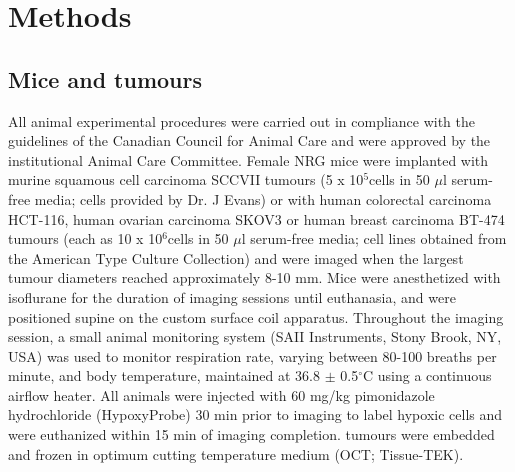 \section{Methods}
\subsection{Mice and tumours}

All animal experimental procedures were carried out in compliance with the guidelines of the Canadian Council for Animal Care and were approved by the institutional Animal Care Committee. 
Female NRG mice were implanted with murine squamous cell carcinoma SCCVII tumours (5 x 10$^5 $cells in 50 $\mu$l serum-free media; cells provided by Dr. J Evans) or with human colorectal carcinoma HCT-116, human ovarian carcinoma SKOV3 or human breast carcinoma BT-474 tumours (each as 10 x 10$^6 $cells in 50 $\mu$l serum-free media; cell lines obtained from the American Type Culture Collection) and were imaged when the largest tumour diameters reached approximately 8-10 mm.
Mice were anesthetized with isoflurane for the duration of imaging sessions until euthanasia, and were positioned supine on the custom surface coil apparatus.
Throughout the imaging session, a small animal monitoring system (SAII Instruments, Stony Brook, NY, USA) was used to monitor respiration rate, varying between 80-100 breaths per minute, and body temperature, maintained at 36.8 $\pm$ 0.5$^\circ$C using a continuous airflow heater.
All animals were injected with 60 mg/kg pimonidazole hydrochloride (HypoxyProbe) 30 min prior to imaging to label hypoxic cells and were euthanized within 15 min of imaging completion.
tumours were embedded and frozen in optimum cutting temperature medium (OCT; Tissue-TEK).

